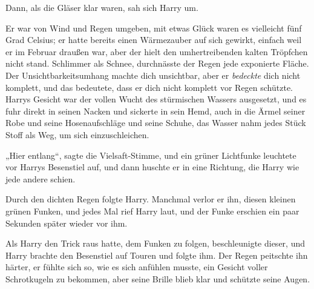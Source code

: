 Dann, als die Gläser klar waren, sah sich Harry um.

Er war von Wind und Regen umgeben, mit etwas Glück waren es vielleicht fünf Grad Celsius; er hatte bereits einen Wärmezauber auf sich gewirkt, einfach weil er im Februar draußen war, aber der hielt den umhertreibenden kalten Tröpfchen nicht stand. Schlimmer als Schnee, durchnässte der Regen jede exponierte Fläche. Der Unsichtbarkeitsumhang machte dich unsichtbar, aber er \emph{bedeckte} dich nicht komplett, und das bedeutete, dass er dich nicht komplett vor Regen schützte. Harrys Gesicht war der vollen Wucht des stürmischen Wassers ausgesetzt, und es fuhr direkt in seinen Nacken und sickerte in sein Hemd, auch in die Ärmel seiner Robe und seine Hosenaufschläge und seine Schuhe, das Wasser nahm jedes Stück Stoff als Weg, um sich einzuschleichen.

„Hier entlang“, sagte die Vielsaft-Stimme, und ein grüner Lichtfunke leuchtete vor Harrys Besenstiel auf, und dann huschte er in eine Richtung, die Harry wie jede andere schien.

Durch den dichten Regen folgte Harry. Manchmal verlor er ihn, diesen kleinen grünen Funken, und jedes Mal rief Harry laut, und der Funke erschien ein paar Sekunden später wieder vor ihm.

Als Harry den Trick raus hatte, dem Funken zu folgen, beschleunigte dieser, und Harry brachte den Besenstiel auf Touren und folgte ihm. Der Regen peitschte ihn härter, er fühlte sich so, wie es sich anfühlen musste, ein Gesicht voller Schrotkugeln zu bekommen, aber seine Brille blieb klar und schützte seine Augen.

